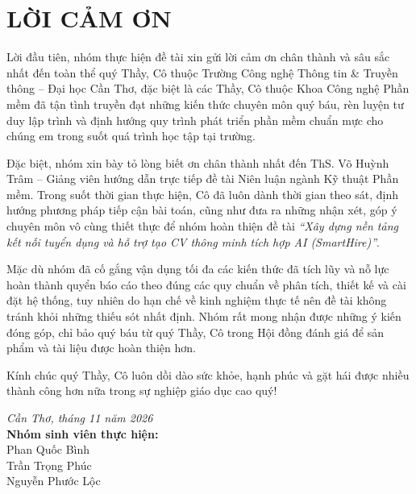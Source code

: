 

\newpage

\section*{LỜI CẢM ƠN}

Lời đầu tiên, nhóm thực hiện đề tài xin gửi lời cảm ơn chân thành và sâu sắc nhất đến toàn thể quý Thầy, Cô thuộc Trường Công nghệ Thông tin \& Truyền thông – Đại học Cần Thơ, đặc biệt là các Thầy, Cô thuộc Khoa Công nghệ Phần mềm đã tận tình truyền đạt những kiến thức chuyên môn quý báu, rèn luyện tư duy lập trình và định hướng quy trình phát triển phần mềm chuẩn mực cho chúng em trong suốt quá trình học tập tại trường.

Đặc biệt, nhóm xin bày tỏ lòng biết ơn chân thành nhất đến ThS. Võ Huỳnh Trâm – Giảng viên hướng dẫn trực tiếp đề tài Niên luận ngành Kỹ thuật Phần mềm. Trong suốt thời gian thực hiện, Cô đã luôn dành thời gian theo sát, định hướng phương pháp tiếp cận bài toán, cũng như đưa ra những nhận xét, góp ý chuyên môn vô cùng thiết thực để nhóm hoàn thiện đề tài \textit{“Xây dựng nền tảng kết nối tuyển dụng và hỗ trợ tạo CV thông minh tích hợp AI (SmartHire)”}.

Mặc dù nhóm đã cố gắng vận dụng tối đa các kiến thức đã tích lũy và nỗ lực hoàn thành quyển báo cáo theo đúng các quy chuẩn về phân tích, thiết kế và cài đặt hệ thống, tuy nhiên do hạn chế về kinh nghiệm thực tế nên đề tài không tránh khỏi những thiếu sót nhất định. Nhóm rất mong nhận được những ý kiến đóng góp, chỉ bảo quý báu từ quý Thầy, Cô trong Hội đồng đánh giá để sản phẩm và tài liệu được hoàn thiện hơn.

Kính chúc quý Thầy, Cô luôn dồi dào sức khỏe, hạnh phúc và gặt hái được nhiều thành công hơn nữa trong sự nghiệp giáo dục cao quý!

\vspace{1.2cm}

\begin{raggedleft}
    \textit{Cần Thơ, tháng 11 năm 2026}\\[8pt]
    \textbf{Nhóm sinh viên thực hiện:}\\[6pt]
    Phan Quốc Bình\\
    Trần Trọng Phúc\\
    Nguyễn Phước Lộc\\
\end{raggedleft}